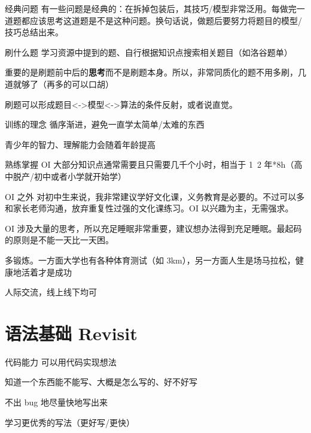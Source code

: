 \documentclass[11pt,aspectratio=169]{beamer}
\begin{document}
\begin{frame}{经典问题}
    有一些问题是经典的：在拆掉包装后，其技巧/模型非常泛用。每做完一道题都应该思考这道题是不是这种问题。换句话说，做题后要努力将题目的模型/技巧总结出来。
\end{frame}

\begin{frame}{刷什么题}
    学习资源中提到的题、自行根据知识点搜索相关题目（如洛谷题单）

    重要的是刷题前中后的\textbf{思考}而不是刷题本身。所以，非常同质化的题不用多刷，几道就够了（再多的可以口胡）

    刷题可以形成题目<->模型<->算法的条件反射，或者说直觉。
\end{frame}

\begin{frame}{训练的理念}
    循序渐进，避免一直学太简单/太难的东西

    青少年的智力、理解能力会随着年龄提高

    熟练掌握 OI 大部分知识点通常需要且只需要几千个小时，相当于 1~2 年*8h（高中脱产/初中或者小学就开始学） 
\end{frame}

\begin{frame}{OI 之外}
    对初中生来说，我非常建议学好文化课，义务教育是必要的。不过可以多和家长老师沟通，放弃重复性过强的文化课练习。OI 以兴趣为主，无需强求。

    OI 涉及大量的思考，所以充足睡眠非常重要，建议想办法得到充足睡眠。最起码的原则是不能一天比一天困。

    多锻炼。一方面大学也有各种体育测试（如 3km），另一方面人生是场马拉松，健康地活着才是成功

    人际交流，线上线下均可
\end{frame}

\section{语法基础 Revisit}

\begin{frame}{代码能力}
    可以用代码实现想法

    知道一个东西能不能写、大概是怎么写的、好不好写
    
    不出 bug 地尽量快地写出来

    学习更优秀的写法（更好写/更快）
\end{frame}
\end{document}
